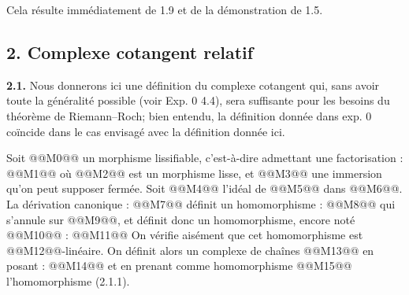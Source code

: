 

Cela résulte immédiatement de 1.9 et de la démonstration de 1.5.

\subsection*{2. Complexe cotangent relatif}

\textbf{2.1.} Nous donnerons ici une définition du complexe cotangent qui, sans avoir toute la généralité possible (voir Exp. 0 4.4), sera suffisante pour les besoins du théorème de Riemann--Roch; bien entendu, la définition donnée dans exp. 0 coïncide dans le cas envisagé avec la définition donnée ici.

Soit @@M0@@ un morphisme lissifiable, c'est-à-dire admettant une factorisation :
@@M1@@
où @@M2@@ est un morphisme lisse, et @@M3@@ une immersion qu'on peut supposer fermée. Soit @@M4@@ l'idéal de @@M5@@ dans @@M6@@. La dérivation canonique :
@@M7@@
définit un homomorphisme :
@@M8@@
qui s'annule sur @@M9@@, et définit donc un homomorphisme, encore noté @@M10@@ :
@@M11@@
On vérifie aisément que cet homomorphisme est @@M12@@-linéaire. On définit alors un complexe de chaînes @@M13@@ en posant :
@@M14@@
et en prenant comme homomorphisme @@M15@@ l'homomorphisme (2.1.1).

